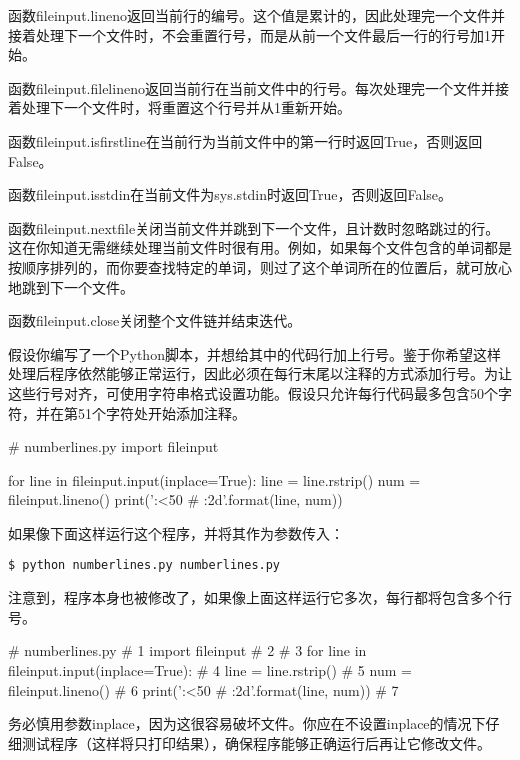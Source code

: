 函数fileinput.lineno返回当前行的编号。这个值是累计的，因此处理完一个文件并接着处理下一个文件时，不会重置行号，而是从前一个文件最后一行的行号加1开始。

函数fileinput.filelineno返回当前行在当前文件中的行号。每次处理完一个文件并接着处理下一个文件时，将重置这个行号并从1重新开始。

函数fileinput.isfirstline在当前行为当前文件中的第一行时返回True，否则返回False。

函数fileinput.isstdin在当前文件为sys.stdin时返回True，否则返回False。

函数fileinput.nextfile关闭当前文件并跳到下一个文件，且计数时忽略跳过的行。这在你知道无需继续处理当前文件时很有用。例如，如果每个文件包含的单词都是按顺序排列的，而你要查找特定的单词，则过了这个单词所在的位置后，就可放心地跳到下一个文件。

函数fileinput.close关闭整个文件链并结束迭代。

\begin{tcolorbox}[title=fileinput小案例]
假设你编写了一个Python脚本，并想给其中的代码行加上行号。鉴于你希望这样处理后程序依然能够正常运行，因此必须在每行末尾以注释的方式添加行号。为让这些行号对齐，可使用字符串格式设置功能。假设只允许每行代码最多包含50个字符，并在第51个字符处开始添加注释。

\begin{pyc}
# numberlines.py
import fileinput

for line in fileinput.input(inplace=True):
    line = line.rstrip()
    num = fileinput.lineno()
    print('{:<50} # {:2d}'.format(line, num))
\end{pyc}
如果像下面这样运行这个程序，并将其作为参数传入：

\verb|$ python numberlines.py numberlines.py|

注意到，程序本身也被修改了，如果像上面这样运行它多次，每行都将包含多个行号。
\begin{pyc}
# numberlines.py                                   #  1
import fileinput                                   #  2
                                                   #  3
for line in fileinput.input(inplace=True):         #  4
    line = line.rstrip()                           #  5
    num = fileinput.lineno()                       #  6
    print('{:<50} # {:2d}'.format(line, num))      #  7
\end{pyc}
\begin{tcolorbox}[title=警告,colback=red!10, colframe=red!50!black]
务必慎用参数inplace，因为这很容易破坏文件。你应在不设置inplace的情况下仔细测试程序（这样将只打印结果），确保程序能够正确运行后再让它修改文件。
\end{tcolorbox}
\end{tcolorbox}
